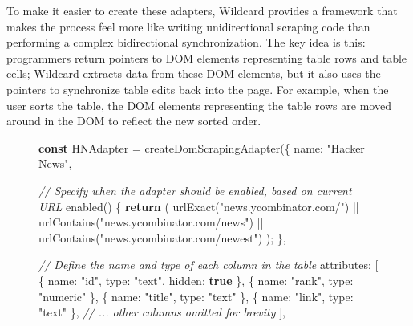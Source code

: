 \documentclass[sigplan,screen,10pt,anonymous,review]{acmart}
\newenvironment{Shaded}{}{}
\newcommand{\AttributeTok}[1]{\textcolor[rgb]{0.49,0.56,0.16}{#1}}
\newcommand{\CommentTok}[1]{\textcolor[rgb]{0.38,0.63,0.69}{\textit{#1}}}
\newcommand{\ControlFlowTok}[1]{\textcolor[rgb]{0.00,0.44,0.13}{\textbf{#1}}}
\newcommand{\DataTypeTok}[1]{\textcolor[rgb]{0.56,0.13,0.00}{#1}}
\newcommand{\KeywordTok}[1]{\textcolor[rgb]{0.00,0.44,0.13}{\textbf{#1}}}
\newcommand{\NormalTok}[1]{#1}
\newcommand{\OperatorTok}[1]{\textcolor[rgb]{0.40,0.40,0.40}{#1}}
\newcommand{\StringTok}[1]{\textcolor[rgb]{0.25,0.44,0.63}{#1}}
\begin{document}
To make it easier to create these adapters, Wildcard provides a
framework that makes the process feel more like writing unidirectional
scraping code than performing a complex bidirectional synchronization.
The key idea is this: programmers return pointers to DOM elements
representing table rows and table cells; Wildcard extracts data from
these DOM elements, but it also uses the pointers to synchronize table
edits back into the page. For example, when the user sorts the table,
the DOM elements representing the table rows are moved around in the DOM
to reflect the new sorted order.

\begin{figure}

\begin{Shaded}
\begin{Highlighting}[]
\KeywordTok{const}\NormalTok{ HNAdapter }\OperatorTok{=} \AttributeTok{createDomScrapingAdapter}\NormalTok{(}\OperatorTok{\{}
  \DataTypeTok{name}\OperatorTok{:} \StringTok{"Hacker News"}\OperatorTok{,}

  \CommentTok{// Specify when the adapter should be enabled, based on current URL}
  \AttributeTok{enabled}\NormalTok{() }\OperatorTok{\{}
    \ControlFlowTok{return}\NormalTok{ (}
      \AttributeTok{urlExact}\NormalTok{(}\StringTok{"news.ycombinator.com/"}\NormalTok{) }\OperatorTok{||}
      \AttributeTok{urlContains}\NormalTok{(}\StringTok{"news.ycombinator.com/news"}\NormalTok{) }\OperatorTok{||}
      \AttributeTok{urlContains}\NormalTok{(}\StringTok{"news.ycombinator.com/newest"}\NormalTok{)}
\NormalTok{    )}\OperatorTok{;}
  \OperatorTok{\},}

  \CommentTok{// Define the name and type of each column in the table}
  \DataTypeTok{attributes}\OperatorTok{:}\NormalTok{ [}
    \OperatorTok{\{} \DataTypeTok{name}\OperatorTok{:} \StringTok{"id"}\OperatorTok{,} \DataTypeTok{type}\OperatorTok{:} \StringTok{"text"}\OperatorTok{,} \DataTypeTok{hidden}\OperatorTok{:} \KeywordTok{true} \OperatorTok{\},}
    \OperatorTok{\{} \DataTypeTok{name}\OperatorTok{:} \StringTok{"rank"}\OperatorTok{,} \DataTypeTok{type}\OperatorTok{:} \StringTok{"numeric"} \OperatorTok{\},}
    \OperatorTok{\{} \DataTypeTok{name}\OperatorTok{:} \StringTok{"title"}\OperatorTok{,} \DataTypeTok{type}\OperatorTok{:} \StringTok{"text"} \OperatorTok{\},}
    \OperatorTok{\{} \DataTypeTok{name}\OperatorTok{:} \StringTok{"link"}\OperatorTok{,} \DataTypeTok{type}\OperatorTok{:} \StringTok{"text"} \OperatorTok{\},}
    \CommentTok{// ... other columns omitted for brevity}
\NormalTok{  ]}\OperatorTok{,}


\end{Highlighting}
\end{Shaded}
\end{figure}
\end{document}
